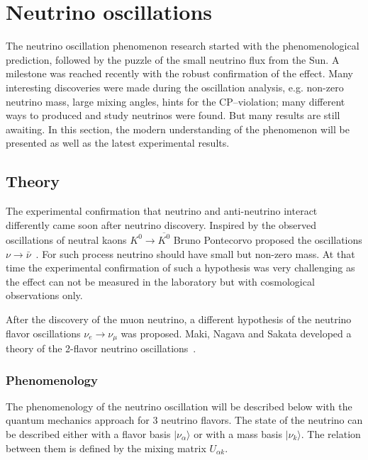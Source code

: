 \documentclass[../main.tex]{subfiles}
\begin{document}

\section{Neutrino oscillations}
\label{sec:intro:osc}
The neutrino oscillation phenomenon research started with the phenomenological prediction, followed by the puzzle of the small neutrino flux from the Sun. A milestone was reached recently with the robust confirmation of the effect. Many interesting discoveries were made during the oscillation analysis, e.g. non-zero neutrino mass, large mixing angles, hints for the CP--violation; many different ways to produced and study neutrinos were found. But many results are still awaiting. In this section, the modern understanding of the phenomenon will be presented as well as the latest experimental results.

\subsection{Theory}
The experimental confirmation that neutrino and anti-neutrino interact differently came soon after neutrino discovery. Inspired by the observed oscillations of neutral kaons $K^0\to\overline{K^0}$ Bruno Pontecorvo proposed the oscillations $\nu\to\bar\nu$~\cite{Pontecorvo1957}. For such process neutrino should have small but non-zero mass. At that time the experimental confirmation of such a hypothesis was very challenging as the effect can not be measured in the laboratory but with cosmological observations only.

After the discovery of the muon neutrino, a different hypothesis of the neutrino flavor oscillations $\nu_e\to\nu_\mu$ was proposed. Maki, Nagava and Sakata developed a theory of the 2-flavor neutrino oscillations~\cite{Maki1962}.

\subsubsection{Phenomenology}
The phenomenology of the neutrino oscillation will be described below with the quantum mechanics approach for 3 neutrino flavors. The state of the neutrino can be described either with a flavor basis $\lvert\nu_\alpha\rangle$ or with a mass basis $\lvert\nu_k\rangle$. The relation between them is defined by the mixing matrix $U_{\alpha k}$.
\end{document}
